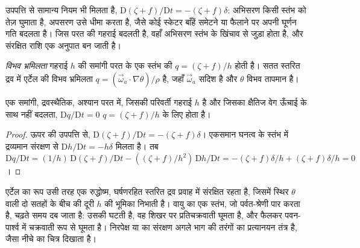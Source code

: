 उपपत्ति से सामान्य नियम भी मिलता है, $\mathrm D(\zeta + f)/\mathrm Dt =
-(\zeta + f)\delta$: अभिसरण किसी स्तंभ को तेज़ घुमाता है, अपसरण उसे धीमा करता है,
जैसे कोई स्केटर बाँहें समेटने या फैलाने पर अपनी घूर्णन गति बदलता है। जिस परत की गहराई बदलती है,
वहाँ अभिसरण स्तंभ के खिंचाव से जुड़ा होता है, और
संरक्षित राशि एक अनुपात बन जाती है।

\begin{definition}[विभव भ्रमिलता]\label{def:b3:atmospheric-dynamics:pv}
\emph{विभव भ्रमिलता} गहराई $h$ की समांगी परत के एक स्तंभ की
$q = (\zeta + f)/h$ होती है। सतत स्तरित द्रव में एर्टेल की विभव भ्रमिलता
$q = (\vec\omega_a\cdot
\nabla\theta)/\rho$ है, जहाँ $\vec\omega_a$  सदिश है और
$\theta$ विभव तापमान है।
\end{definition}

\begin{theorem}[विभव भ्रमिलता का संरक्षण]\label{thm:b3:atmospheric-dynamics:pv}
एक समांगी, द्रवस्थैतिक, अश्यान परत में, जिसकी परिवर्ती गहराई $h$ है और
जिसका क्षैतिज वेग ऊँचाई के साथ नहीं बदलता, $\mathrm Dq/\mathrm Dt = 0$
$q = (\zeta + f)/h$ के लिए होता है।
\end{theorem}

\begin{proof}
ऊपर की उपपत्ति से, $\mathrm D(\zeta + f)/\mathrm Dt = -(\zeta + f)\delta$।
एकसमान घनत्व के स्तंभ में द्रव्यमान संरक्षण से $\mathrm Dh/\mathrm
Dt = -h\delta$ मिलता है। तब $\mathrm Dq/\mathrm Dt = (1/h)\,\mathrm D(\zeta +
f)/\mathrm Dt - ((\zeta + f)/h^2)\,\mathrm Dh/\mathrm Dt = -(\zeta +
f)\delta/h + (\zeta + f)\delta/h = 0$।
\end{proof}

एर्टेल का रूप उसी तरह एक रुद्धोष्म, घर्षणरहित स्तरित द्रव प्रवाह में संरक्षित रहता है,
जिसमें स्थिर $\theta$ वाली दो सतहों के बीच की दूरी
$h$ की भूमिका निभाती है। वायु का एक स्तंभ, जो
पर्वत-श्रेणी पार करता है, चढ़ते समय दब जाता है: उसकी  घटती है, वह
शिखर पर प्रतिचक्रवाती घूमता है, और फैलकर
पवन-पार्श्व में चक्रवाती रूप से घूमता है। निरपेक्ष
या  का संरक्षण अगले भाग की तरंगों का प्रत्यानयन तंत्र है,
जैसा नीचे का चित्र दिखाता है।

